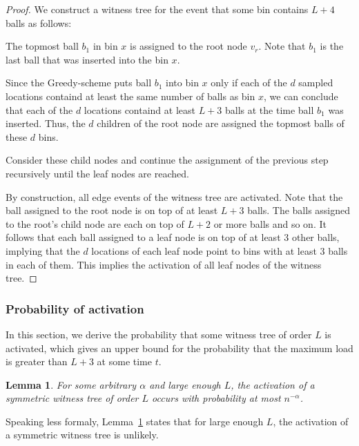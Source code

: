 \documentclass[a4paper,12pt]{article}
\newtheorem{lemma}{Lemma}
\begin{document}
\begin{proof}
We construct a witness tree for the event that some bin contains $L+4$ balls as follows:
\begin{compactenum}
\item The topmost ball $b_1$ in bin $x$ is assigned to the root node $v_r$. Note that $b_1$ is the last ball that was inserted into the bin $x$.
\item Since the Greedy-scheme puts ball $b_1$ into bin $x$ only if each of the $d$ sampled locations containd at least the same number of balls as bin $x$, we can conclude that each of the $d$ locations containd at least $L+3$ balls at the time ball $b_1$ was inserted. Thus, the $d$ children of the root node are assigned the topmost balls of these $d$ bins.
\item Consider these child nodes and continue the assignment of the previous step recursively until the leaf nodes are reached.  
\end{compactenum}

By construction, all edge events of the witness tree are activated. Note that the ball assigned to the root node is on top of at least $L+3$ balls. The balls assigned to the root's child node are each on top of $L+2$ or more balls and so on. It follows that each ball assigned to a leaf node is on top of at least 3 other balls, implying that the $d$ locations of each leaf node point to bins with at least 3 balls in each of them. This implies the activation of all leaf nodes of the witness tree.
\end{proof}

\subsubsection{Probability of activation}
\label{sec:analysis:probabilitySymWT}
In this section, we derive the probability that some witness tree of order $L$ is activated, which gives an upper bound for the probability that the maximum load is greater than $L+3$ at some time $t$. 

\begin{lemma}\label{lemma:swt:activation}
For some arbitrary $\alpha$ and large enough $L$, the activation of a symmetric witness tree of order $L$ occurs with probability at most $n^{-\alpha}$.
\end{lemma}
Speaking less formaly, Lemma~\ref{lemma:swt:activation} states that for large enough $L$, the activation of a symmetric witness tree is unlikely.
\end{document}
